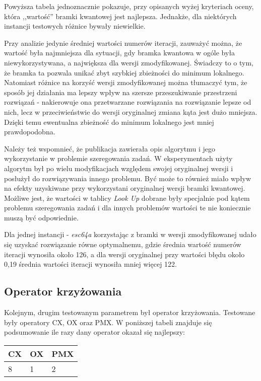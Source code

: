 Powyższa tabela jednoznacznie pokazuje, przy opisanych wyżej kryteriach oceny, która ,,wartość'' bramki kwantowej jest najlepsza. Jednakże, dla niektórych instancji testowych różnice bywały niewielkie. 

Przy analizie jedynie średniej wartości numerów iteracji, zauważyć można, że wartość była najmniejsza dla sytuacji, gdy bramka kwantowa w ogóle była niewykorzystywana, a największa dla wersji zmodyfikowanej. Świadczy to o tym, że bramka ta pozwala unikać zbyt szybkiej zbieżności do minimum lokalnego. Natomiast różnice na korzyść wersji zmodyfikowanej można tłumaczyć tym, że sposób jej działania ma lepszy wpływ na szersze przeszukiwanie przestrzeni rozwiązań - nakierowuje ona przetwarzane rozwiązania na rozwiązanie lepsze od nich, lecz w przeciwieństwie do wersji oryginalnej zmiana kąta jest dużo mniejsza. Dzięki temu ewentualna zbieżność do minimum lokalnego jest mniej prawdopodobna.

Należy też wspomnieć, że publikacja \cite{NPQGA} zawierała opis algorytmu i jego wykorzystanie w problemie szeregowania zadań. W eksperymentach użyty algorytm był po wielu modyfikacjach względem swojej oryginalnej wersji i posłużył do rozwiązywania innego problemu. Być może to również miało wpływ na efekty uzyskiwane przy wykorzystani oryginalnej wersji bramki kwantowej. Możliwe jest, że wartości w tablicy \textit{Look Up} dobrane były specjalnie pod kątem problemu szeregowania zadań i dla innych problemów wartości te nie koniecznie muszą być odpowiednie.

Dla jednej instancji - \textit{esc64a} korzystając z bramki w wersji zmodyfikowanej udało się uzyskać rozwiązanie równe optymalnemu, gdzie średnia wartość numerów iteracji wynosiła około 126, a dla wersji oryginalnej przy wartości błędu około 0,19 średnia wartości iteracji wynosiła mniej więcej 122.

\subsection{Operator krzyżowania}
Kolejnym, drugim testowanym parametrem był operator krzyżowania. Testowane były operatory CX, OX oraz PMX. W poniższej tabeli znajduje się podsumowanie ile razy dany operator okazał się najlepszy:

\begin{table}[H]
\label{cross_oper_results}
\begin{tabular}{l l l}
\hline
CX & OX & PMX \\
\hline
8 & 1 & 2\\
\hline
\end{tabular}
\end{table}

